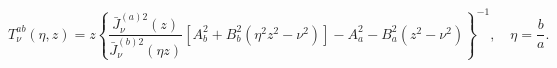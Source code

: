 \begin{equation}
T_{\nu }^{ab}(\eta ,z)=z\left\{ \frac{\bar{J}_{\nu }^{(a)2}(z)}{\bar{J}_{\nu
}^{(b)2}(\eta z)}\left[ A_{b}^{2}+B_{b}^{2}(\eta ^{2}z^{2}-\nu ^{2})\right]
-A_{a}^{2}-B_{a}^{2}(z^{2}-\nu ^{2})\right\} ^{-1},\quad \eta =\frac{b}{a}.
\label{tekaAB}
\end{equation}

